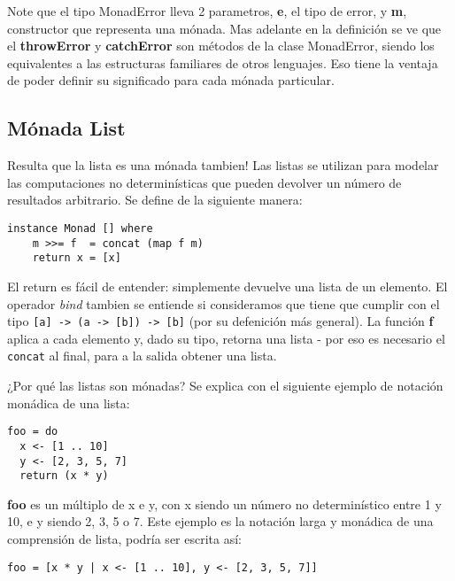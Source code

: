 Note que el tipo MonadError lleva 2 parametros, \textbf{e}, el tipo de error, y \textbf{m}, constructor que representa una mónada. Mas adelante en la definición se ve que el \textbf{throwError} y \textbf{catchError} son métodos de la clase MonadError, siendo los equivalentes a las estructuras familiares de otros lenguajes. Eso tiene la ventaja de poder definir su significado para cada mónada particular.



\subsection{Mónada List} %
\label{sub:m_nada_list}


Resulta que la lista es una mónada tambien! Las listas se utilizan para modelar
las computaciones no determinísticas que pueden devolver un número de
resultados arbitrario. Se define de la siguiente manera:

\begin{lstlisting}
instance Monad [] where
    m >>= f  = concat (map f m)
    return x = [x]
\end{lstlisting}

El return es fácil de entender: simplemente devuelve una lista de un elemento.
El operador \textit{bind} tambien se entiende si consideramos que tiene que
cumplir con el tipo \lstinline$[a] -> (a -> [b]) -> [b]$ (por su defenición
más general). La función \textbf{f} aplica a cada elemento y, dado su tipo,
retorna una lista - por eso es necesario el \lstinline$concat$ al final, para
a la salida obtener una lista.

¿Por qué las listas son mónadas? Se explica con el siguiente ejemplo de
notación monádica de una lista:

\begin{lstlisting}
foo = do
  x <- [1 .. 10]
  y <- [2, 3, 5, 7]
  return (x * y)
\end{lstlisting}

\textbf{foo} es un múltiplo de x e y, con x siendo un número no determinístico
entre 1 y 10, e y siendo 2, 3, 5 o 7. Este ejemplo es la notación larga y
monádica de una comprensión de lista, podría ser escrita así:

\begin{lstlisting}
foo = [x * y | x <- [1 .. 10], y <- [2, 3, 5, 7]]
\end{lstlisting}


